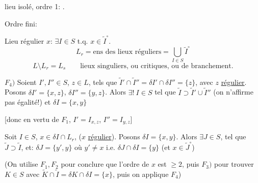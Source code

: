 

lieu isolé, ordre 1: .

Ordre fini:


Lieu régulier $x$: $\exists I\in S$ t.q. $x\in\tilde I^\circ$.
\[
L_r=\text{ens des lieux réguliers}=\bigcup_{I\in S}\tilde I^\circ
\]
\[
L\setminus L_r=L_s\qquad
\text{lieux singuliers, ou critiques, ou de branchement.}
\]

$F_4)$ Soient $I',I''\in S$, $z\in L$, tels que
$\tilde I'\cap\tilde I''=\delta I'\cap\delta I''=\{z\}$, avec $z$ \uline{régulier}.
Posons $\delta I'=\{x,z\}$, $\delta I''=\{y,z\}$. Alors
$\exists!\ I\in S$ tel que $\tilde I\supset\tilde I'\cup\tilde I''$
(on n'affirme pas égalité!) et $\delta I=\{x,y\}$

[donc en vertu de $F_1$, $I'=I_{x,z}$, $I''=I_{y,z}$]

Soit $I\in S$, $x\in\delta I\cap L_r$,  ($x$ \uline{régulier}).
Posons $\delta I=\{x,y\}$. Alors $\exists J\in S$, tel que
$\tilde J\supset\tilde I$, et: $\delta J=\{y',y\}$ où $y'\neq x$
i.e. $\delta J\cap\delta I=\{y\}$ (et $x\in\tilde J^\circ$)


(On utilise $F_1,F_2$ pour conclure que l'ordre de $x$ est $\geq2$, puis $F_3)$ pour trouver $K\in S$ avec $\tilde K\cap\tilde I=\delta K\cap\delta I=\{x\}$, puis on applique $F_4$)


